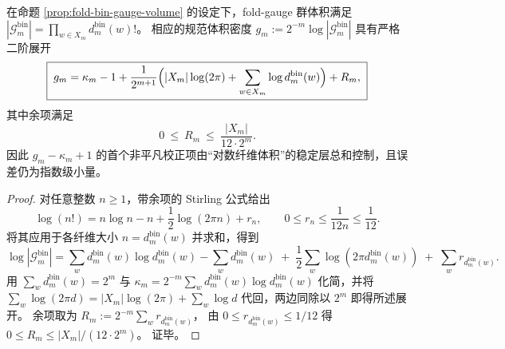 \begin{theorem}\label{thm:fold-bin-gauge-volume-stirling-second-order}
在命题 \ref{prop:fold-bin-gauge-volume} 的设定下，fold-gauge 群体积满足
\(
|\mathcal{G}^{\mathrm{bin}}_m|=\prod_{w\in X_m} d^{\mathrm{bin}}_m(w)!
\)。
相应的规范体积密度 \(g_m:=2^{-m}\log|\mathcal{G}^{\mathrm{bin}}_m|\) 具有严格二阶展开
\[
\boxed{\;
g_m
=\kappa_m-1+\frac{1}{2^{m+1}}\Bigl(|X_m|\log(2\pi)+\sum_{w\in X_m}\log d^{\mathrm{bin}}_m(w)\Bigr)+R_m,
\;}
\]
其中余项满足
\[
\boxed{\;0\ \le\ R_m\ \le\ \frac{|X_m|}{12\cdot 2^m}.\;}
\]
因此 \(g_m-\kappa_m+1\) 的首个非平凡校正项由“对数纤维体积”的稳定层总和控制，且误差仍为指数级小量。
\end{theorem}
\begin{proof}
对任意整数 \(n\ge 1\)，带余项的 Stirling 公式给出
\[
\log(n!)=n\log n-n+\frac12\log(2\pi n)+r_n,
\qquad 0\le r_n\le \frac{1}{12n}\le \frac{1}{12}.
\]
将其应用于各纤维大小 \(n=d^{\mathrm{bin}}_m(w)\) 并求和，得到
\[
\log|\mathcal{G}^{\mathrm{bin}}_m|
=\sum_{w}d^{\mathrm{bin}}_m(w)\log d^{\mathrm{bin}}_m(w)-\sum_w d^{\mathrm{bin}}_m(w)
\;+\;\frac12\sum_w\log(2\pi d^{\mathrm{bin}}_m(w))
\;+\;\sum_w r_{d^{\mathrm{bin}}_m(w)}.
\]
用 \(\sum_w d^{\mathrm{bin}}_m(w)=2^m\) 与 \(\kappa_m=2^{-m}\sum_w d^{\mathrm{bin}}_m(w)\log d^{\mathrm{bin}}_m(w)\) 化简，并将
\(
\sum_w \log(2\pi d)=|X_m|\log(2\pi)+\sum_w\log d
\)
代回，两边同除以 \(2^m\) 即得所述展开。
余项取为
\(
R_m:=2^{-m}\sum_w r_{d^{\mathrm{bin}}_m(w)}
\)，
由 \(0\le r_{d^{\mathrm{bin}}_m(w)}\le 1/12\) 得
\(
0\le R_m\le |X_m|/(12\cdot 2^m)
\)。
证毕。
\end{proof}
